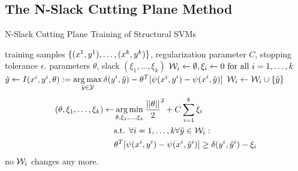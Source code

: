 \subsection{The N-Slack Cutting Plane Method}
\begin{algorithm*}[t]
    \caption{N-Slack Cutting Plane Training of Structural SVMs \label{alg_n_slack}}
    \begin{doublespacing}
    \begin{algorithmic}[1]
        \Require training samples $\{ (x^{1}, y^{1}), \dots, (x^{k}, y^{k})\}$, regularization parameter $C$, stopping tolerance $\epsilon$.
        \Ensure parameters $\theta$, slack $(\xi_1, \dotsc, \xi_k)$
        \State $\mathcal{W}_i \leftarrow \emptyset, \xi_i \leftarrow 0 \text{ for all } i=1,\dots,k$
        \Repeat
                \State
                $\hat{y} \leftarrow I(x^{i}, y^{i}, \theta) := \displaystyle \operatorname*{arg\,max}_{\hat{y}\in\mathcal{Y}} \delta(y^{i}, \hat{y}) - \theta^T [\psi(x^{i}, y^{i}) - \psi(x^{i}, \hat{y})] $
                    \State $\mathcal{W}_i \leftarrow \mathcal{W}_i \cup \{ \hat{y}\} $
                    \State
                    \vspace{-15mm}
                    \begin{align*}
                    (\theta, \xi_1, \dots, \xi_k) \leftarrow \displaystyle &\operatorname*{arg\,min}_{\theta, \xi_1, \dots, \xi_k} \frac{||\theta||}{2}^2 + C \sum_{i=1}^k\xi_i\\
                    &\text{s.t. }\forall i=1,\dots,k \forall \hat{y} \in \mathcal{W}_i:\\
                    &\theta^T [\psi(x^{i}, y^{i}) - \psi(x^{i}, \hat{y}^{i})] \geq \delta(y^{i}, \hat{y}^{i}) - \xi_i
                    \end{align*}
                \EndIf
            \EndFor
            \vspace{-10mm}
            \Until no $\mathcal{W}_i$ changes any more.
        \end{algorithmic}
    \end{doublespacing}
    \end{algorithm*}



